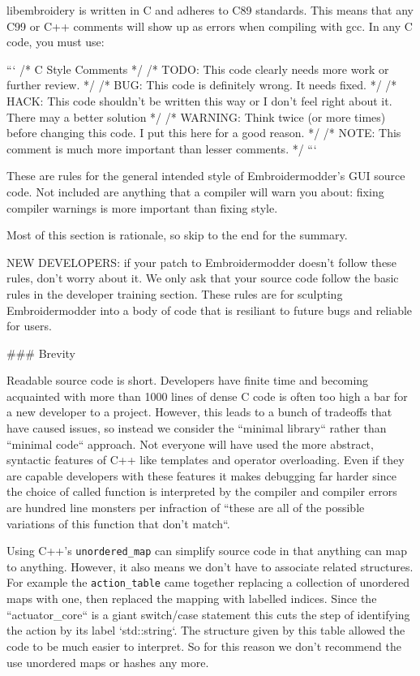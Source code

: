 libembroidery is written in C and adheres to C89 standards. This means
that any C99 or C++ comments will show up as errors when compiling with
gcc. In any C code, you must use:

```
/* C Style Comments */
/* TODO: This code clearly needs more work or further review. */
/* BUG: This code is definitely wrong. It needs fixed. */
/* HACK: This code shouldn't be written this way or I don't feel right about it. There may a better solution */
/* WARNING: Think twice (or more times) before changing this code. I put this here for a good reason. */
/* NOTE: This comment is much more important than lesser comments. */
```

These are rules for the general intended style of Embroidermodder's GUI source
code. Not included are anything that a compiler will warn you about: fixing
compiler warnings is more important than fixing style.

Most of this section is rationale, so skip to the end for the summary.

NEW DEVELOPERS: if your patch to Embroidermodder doesn't follow these rules,
don't worry about it. We only ask that your source code follow the basic rules
in the developer training section. These rules are for sculpting Embroidermodder
into a body of code that is resiliant to future bugs and reliable for users.

### Brevity

Readable source code is short. Developers have finite time and becoming
acquainted with more than 1000 lines of dense C code is often too high a bar
for a new developer to a project. However, this leads to a bunch of tradeoffs
that have caused issues, so instead we consider the ``minimal library``
rather than ``minimal code`` approach. Not everyone will have used the more
abstract, syntactic features of C++ like templates and operator overloading.
Even if they are capable developers with these features it makes debugging far
harder since the choice of called function is interpreted by the compiler and compiler
errors are hundred line monsters per infraction of ``these are all of the possible
variations of this function that don't match``.

Using C++'s \texttt{unordered\_map} can simplify source code in that anything can
map to anything. However, it also means we don't have to associate related structures.
For example the \texttt{action\_table} came together replacing a collection of unordered maps
with one, then replaced the mapping with labelled indices. Since the ``actuator\_core``
is a giant switch/case statement this cuts the step of identifying the action by its
label `std::string`.
The structure given by this table allowed the code to be much
easier to interpret. So for this reason we don't recommend the use unordered maps or hashes any more.

